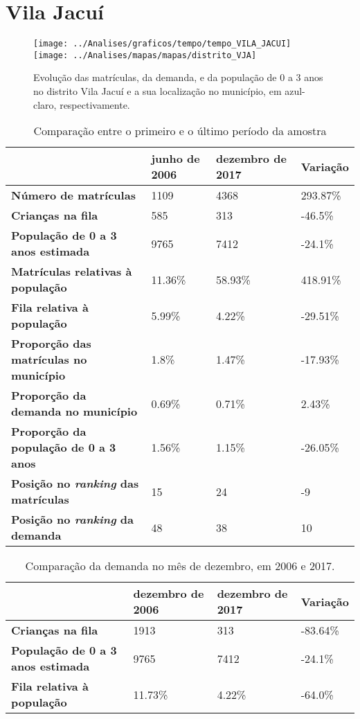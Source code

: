 \section{Vila Jacuí}
\begin{figure}[H]
\centering
\texttt{[image: ../Analises/graficos/tempo/tempo\_VILA\_JACUI]}
\texttt{[image: ../Analises/mapas/mapas/distrito\_VJA]}
\caption{Evolução das matrículas, da demanda, e da população de 0 a 3 anos no distrito Vila Jacuí e a sua localização no município, em azul-claro, respectivamente.}
\end{figure}
\begin{table}[H]
\begin{tabular}{l|l|l|l}
\textbf{}                                      & \textbf{junho de 2006}       & \textbf{dezembro de 2017}    & \textbf{Variação} \\ \hline
\textbf{Número de matrículas}                  & 1109 & 4368 & 293.87\% \\ \hline
\textbf{Crianças na fila}                      & 585 & 313 & -46.5\% \\ \hline
\textbf{População de 0 a 3 anos estimada}      & 9765 & 7412 & -24.1\% \\ \hline
\textbf{Matrículas relativas à população}      & 11.36\% & 58.93\% & 418.91\% \\ \hline
\textbf{Fila relativa à população}             & 5.99\% & 4.22\% & -29.51\% \\ \hline
\textbf{Proporção das matrículas no município} & 1.8\% & 1.47\% & -17.93\% \\ \hline
\textbf{Proporção da demanda no município}     & 0.69\% & 0.71\% & 2.43\% \\ \hline
\textbf{Proporção da população de 0 a 3 anos}  & 1.56\% & 1.15\% & -26.05\% \\ \hline
\textbf{Posição no \textit{ranking} das matrículas}     & 15 & 24 & -9 \\ \hline
\textbf{Posição no \textit{ranking} da demanda}         & 48 & 38 & 10 \\ 
\end{tabular}
\caption{Comparação entre o primeiro e o último período da amostra}
\end{table}
\begin{table}[H]
\begin{tabular}{l|l|l|l}
\textbf{}                                 & \textbf{dezembro de 2006} & \textbf{dezembro de 2017} & \textbf{Variação} \\ \hline
\textbf{Crianças na fila}                      & 1913 & 313 & -83.64\% \\ \hline
\textbf{População de 0 a 3 anos estimada}      & 9765 & 7412 & -24.1\% \\ \hline
\textbf{Fila relativa à população}             & 11.73\% & 4.22\% & -64.0\% \\
\end{tabular}
\caption{Comparação da demanda no mês de dezembro, em 2006 e 2017.}
\end{table}
